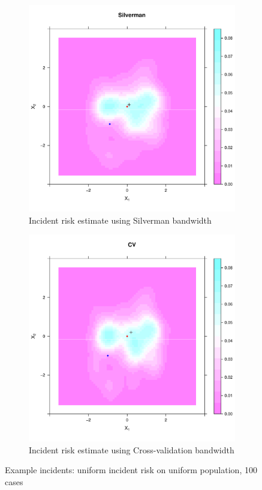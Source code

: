 \begin{figure}[htbp]
    \begin{subfigure}[b]{0.45\textwidth}
    \includegraphics[width=\textwidth]{output/silverman_intensity_heatmap}
    \caption{Incident risk estimate using Silverman bandwidth}
    \end{subfigure}%
    \begin{subfigure}[b]{0.45\textwidth}
    \includegraphics[width=\textwidth]{output/CV_intensity_heatmap}
    \caption{Incident risk estimate using Cross-validation bandwidth}
    \end{subfigure}
    \caption[Example incidents: uniform incident risk on uniform population, 100 cases]
        {Example incidents: uniform incident risk on uniform population, 100 cases}
    \label{fig:cases_heatmap:template}
\end{figure}


